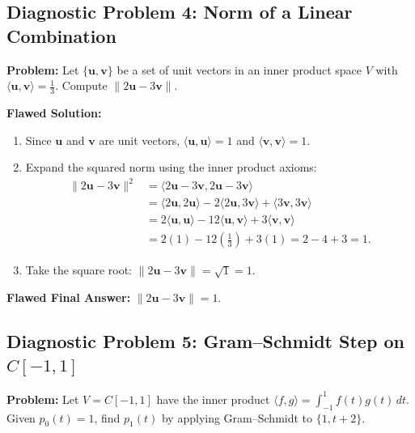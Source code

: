 \documentclass[11pt, letterpaper]{article}
\theoremstyle{definition}
\theoremstyle{remark}
\begin{document}
\subsection{Diagnostic Problem 4: Norm of a Linear Combination}

\textbf{Problem:} Let $\{\mathbf{u}, \mathbf{v}\}$ be a set of unit vectors in an inner product space $V$ with $\langle \mathbf{u}, \mathbf{v} \rangle = \frac{1}{3}$. Compute $\|2\mathbf{u} - 3\mathbf{v}\|$.

\textbf{Flawed Solution:}
\begin{enumerate}
    \item Since $\mathbf{u}$ and $\mathbf{v}$ are unit vectors, $\langle \mathbf{u}, \mathbf{u} \rangle = 1$ and $\langle \mathbf{v}, \mathbf{v} \rangle = 1$.
    \item Expand the squared norm using the inner product axioms:
    \begin{align*}
        \|2\mathbf{u} - 3\mathbf{v}\|^2 &= \langle 2\mathbf{u} - 3\mathbf{v}, 2\mathbf{u} - 3\mathbf{v} \rangle \\
        &= \langle 2\mathbf{u}, 2\mathbf{u} \rangle - 2\langle 2\mathbf{u}, 3\mathbf{v} \rangle + \langle 3\mathbf{v}, 3\mathbf{v} \rangle \\
        &= 2\langle \mathbf{u}, \mathbf{u} \rangle - 12\langle \mathbf{u}, \mathbf{v} \rangle + 3\langle \mathbf{v}, \mathbf{v} \rangle \\
        &= 2(1) - 12\left(\frac{1}{3}\right) + 3(1) = 2 - 4 + 3 = 1.
    \end{align*}
    \item Take the square root: $\|2\mathbf{u} - 3\mathbf{v}\| = \sqrt{1} = 1$.
\end{enumerate}
\textbf{Flawed Final Answer:} $\|2\mathbf{u} - 3\mathbf{v}\| = 1$.

\subsection{Diagnostic Problem 5: Gram--Schmidt Step on $C[-1, 1]$}

\textbf{Problem:} Let $V = C[-1, 1]$ have the inner product $\langle f, g \rangle = \int_{-1}^1 f(t)g(t)\,dt$. Given $p_0(t) = 1$, find $p_1(t)$ by applying Gram--Schmidt to $\{1, t + 2\}$.
\end{document}

